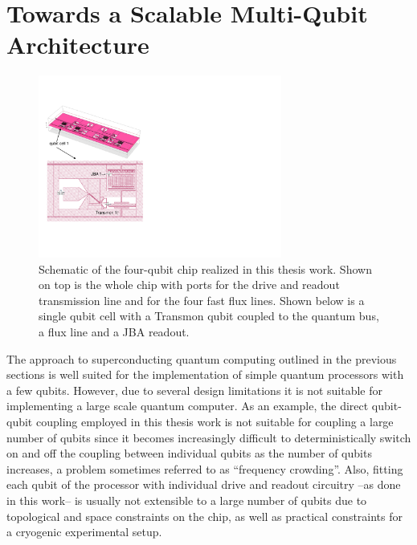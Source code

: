 \section{Towards a Scalable Multi-Qubit Architecture}

\begin{figure}
	\centering
	\includegraphics[width=8cm]{./material/figures/scalable-architecture/scalable_architecture_schematic}
	\caption[Schematic of the four-qubit chip realized in this work]{Schematic of the four-qubit chip realized in this thesis work. Shown on top is the whole chip with ports for the drive and readout transmission line and for the four fast flux lines. Shown below is a single qubit cell with a Transmon qubit coupled to the quantum bus, a flux line and a JBA readout.}
	\label{fig:scalable_architecture_photo}
\end{figure}

The approach to superconducting quantum computing outlined in the previous sections is well suited for the implementation of simple quantum processors with a few qubits. However, due to several design limitations it is not suitable for implementing a large scale quantum computer. As an example, the direct qubit-qubit coupling employed in this thesis work is not suitable for coupling a large number of qubits since it becomes increasingly difficult to deterministically switch on and off the coupling between individual qubits as the number of qubits increases, a problem sometimes referred to as ``frequency crowding''. Also, fitting each qubit of the processor with individual drive and readout circuitry --as done in this work-- is usually not extensible to a large number of qubits due to topological and space constraints on the chip, as well as practical constraints for a cryogenic experimental setup.

\smallskip

